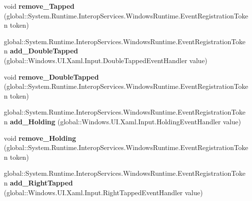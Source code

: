 \begin{DoxyCompactItemize}
\mbox{\label{interface_windows_1_1_u_i_1_1_xaml_1_1_i_u_i_element_a10d8b2df3301a8687ac2a02dbf56e6ad}} 
void {\bfseries remove\+\_\+\+Tapped} (global\+::\+System.\+Runtime.\+Interop\+Services.\+Windows\+Runtime.\+Event\+Registration\+Token token)
\item 
\mbox{\label{interface_windows_1_1_u_i_1_1_xaml_1_1_i_u_i_element_a236a917ea08d09ceea39e12f03cbe17f}} 
global\+::\+System.\+Runtime.\+Interop\+Services.\+Windows\+Runtime.\+Event\+Registration\+Token {\bfseries add\+\_\+\+Double\+Tapped} (global\+::\+Windows.\+U\+I.\+Xaml.\+Input.\+Double\+Tapped\+Event\+Handler value)
\item 
\mbox{\label{interface_windows_1_1_u_i_1_1_xaml_1_1_i_u_i_element_ab7e8271e8ceb0cc5ca0b7bb3423f726f}} 
void {\bfseries remove\+\_\+\+Double\+Tapped} (global\+::\+System.\+Runtime.\+Interop\+Services.\+Windows\+Runtime.\+Event\+Registration\+Token token)
\item 
\mbox{\label{interface_windows_1_1_u_i_1_1_xaml_1_1_i_u_i_element_aa8c0e6b4397f0226baab3ec71083abba}} 
global\+::\+System.\+Runtime.\+Interop\+Services.\+Windows\+Runtime.\+Event\+Registration\+Token {\bfseries add\+\_\+\+Holding} (global\+::\+Windows.\+U\+I.\+Xaml.\+Input.\+Holding\+Event\+Handler value)
\item 
\mbox{\label{interface_windows_1_1_u_i_1_1_xaml_1_1_i_u_i_element_a731b5111082558a2945d799084cfbd79}} 
void {\bfseries remove\+\_\+\+Holding} (global\+::\+System.\+Runtime.\+Interop\+Services.\+Windows\+Runtime.\+Event\+Registration\+Token token)
\item 
\mbox{\label{interface_windows_1_1_u_i_1_1_xaml_1_1_i_u_i_element_ae3a5c2e71c2ae0d8a2d7ce2beb34673e}} 
global\+::\+System.\+Runtime.\+Interop\+Services.\+Windows\+Runtime.\+Event\+Registration\+Token {\bfseries add\+\_\+\+Right\+Tapped} (global\+::\+Windows.\+U\+I.\+Xaml.\+Input.\+Right\+Tapped\+Event\+Handler value)
\item 
\mbox{\label{interface_windows_1_1_u_i_1_1_xaml_1_1_i_u_i_element_a3582ef21b0d8aa47e220b343772155be}} 

\end{DoxyCompactItemize}
